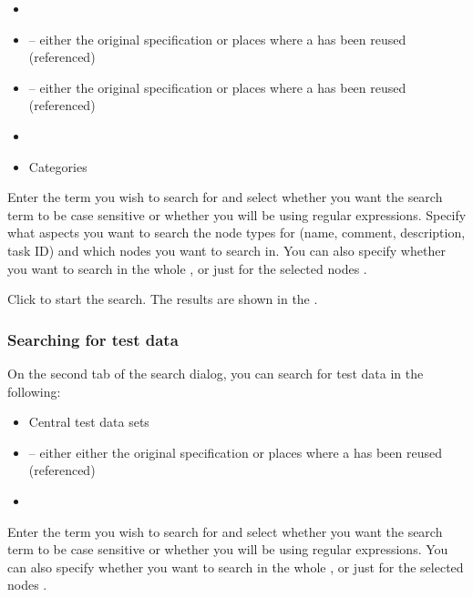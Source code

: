 \begin{itemize}
\item \gdsteps{}
\item \gdcases{} -- either the original specification or places where a \gdcase{} has been reused (referenced)
\item \gdsuites{} -- either the original specification or places where a \gdsuite{} has been reused (referenced)
\item \gdjobs{}
\item Categories
\end{itemize}

Enter the term you wish to search for and select whether you want the search term to be case sensitive or whether you will be using regular expressions. Specify what aspects you want to search the node types for (name, comment, description, task ID) and which nodes you want to search in. You can also specify whether you want to search in the whole \gdproject{}, or just for the selected nodes .

Click  to start the search. The results are shown in the \gdsearchresultview{} . 


\subsubsection{Searching for test data}
\label{TasksSearchData}

On the second tab of the search dialog, you can search for test data in the following:

\begin{itemize}
\item Central test data sets
\item \gdcases{} -- either either the original specification or places where a \gdcase{} has been reused (referenced)
\item \gdsteps{}
\end{itemize}


Enter the term you wish to search for and select whether you want the search term to be case sensitive or whether you will be using regular expressions. You can also specify whether you want to search in the whole \gdproject{}, or just for the selected nodes .


